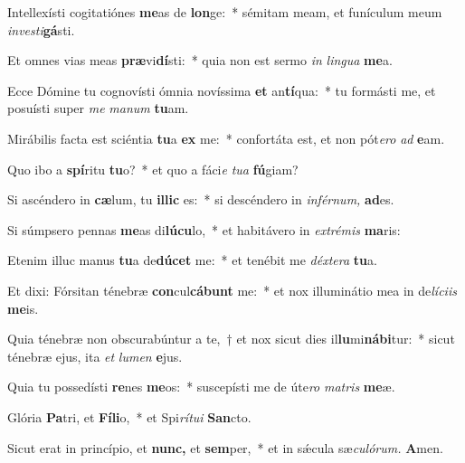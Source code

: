 \item Intellexísti cogitatiónes \textbf{me}as de \textbf{lon}ge:~* sémitam meam, et funículum meum \textit{investi}\textbf{gá}sti.
\item Et omnes vias meas \textbf{præ}vi\textbf{dí}sti:~* quia non est sermo \textit{in} \textit{lingua} \textbf{me}a.
\item Ecce Dómine tu cognovísti ómnia novíssima \textbf{et} an\textbf{tí}qua:~* tu formásti me, et posuísti super \textit{me} \textit{manum} \textbf{tu}am.
\item Mirábilis facta est sciéntia \textbf{tu}a \textbf{ex} me:~* confortáta est, et non pót\hspace{0.03em}\textit{ero} \textit{ad} \textbf{e}am.
\item Quo ibo a \textbf{spí}ritu \textbf{tu}o?~* et quo a fáci\textit{e} \textit{tua} \textbf{fú}giam?
\item Si ascéndero in \textbf{cæ}lum, tu \textbf{il}\textbf{lic} es:~* si descéndero in \textit{inférnum,} \textbf{ad}es.
\item Si súmpsero pennas \textbf{me}as di\textbf{lú}\textbf{cu}lo,~* et habitávero in \textit{extrémis} \textbf{ma}ris:
\item Etenim illuc manus \textbf{tu}a de\textbf{dú}\textbf{cet} me:~* et tenébit me \textit{déxtera} \textbf{tu}a.
\item Et dixi: Fórsitan ténebræ \textbf{con}cul\textbf{cá}\textbf{bunt} me:~* et nox illuminátio mea in de\hspace{0.03em}\textit{líciis} \textbf{me}is.
\item Quia ténebræ non obscurabúntur a te,~† et nox sicut dies il\textbf{lu}mi\textbf{ná}\textbf{bi}tur:~* sicut ténebræ ejus, ita \textit{et} \textit{lumen} \textbf{e}jus.
\item Quia tu possedísti \textbf{re}nes \textbf{me}os:~* suscepísti me de úte\textit{ro} \textit{matris} \textbf{me}æ.
\item Glória \textbf{Pa}tri, et \textbf{Fí}\textbf{li}o,~* et Spi\hspace{0.03em}\textit{rítui} \textbf{San}cto.
\item Sicut erat in princípio, et \textbf{nunc,} et \textbf{sem}per,~* et in sǽcula sæ\hspace{0.03em}\textit{culórum.} \textbf{A}men.

